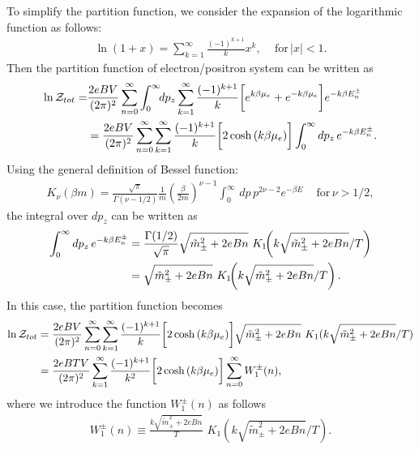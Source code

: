 To simplify the partition function, we consider the expansion of the logarithmic function as follows:
\begin{align}
\ln\left(1+x\right)=\sum^{\infty}_{k=1}\frac{(-1)^{k+1}}{k}x^k, \,\,\,\,\,\,\,\mathrm{for}\,|x|<1.
\end{align}
Then the partition function of electron/positron system can be written as
\begin{align}
\ln\mathcal{Z}_{tot}=&\frac{2eBV}{(2\pi)^2}\sum_{n=0}^\infty\int^\infty_{0} \!\!dp_z\sum^{\infty}_{k=1}\frac{(-1)^{k+1}}{k}\bigg[e^{k\beta\mu_e}+e^{-k\beta\mu_e}\bigg]e^{-k\beta E_n^\pm}\notag\\
&=\frac{2eBV}{(2\pi)^2}\sum_{n=0}^\infty\sum^{\infty}_{k=1}\frac{(-1)^{k+1}}{k}\bigg[2\cosh{(k\beta\mu_e)}\bigg]\int_0^\infty dp_z\,e^{-k\beta E_n^\pm}.
\end{align}
Using the general definition of Bessel function:
\begin{align}
K_\nu(\beta m)=\frac{\sqrt{\pi}}{\Gamma({\nu-1/2})}\frac{1}{m}\left(\frac{\beta}{2m}\right)^{\nu-1}\int_0^\infty\,dp\,p^{2\nu-2}e^{-\beta E} \,\,\,\,\,\,\,\mathrm{for}\,\nu>1/2,
\end{align}
the integral over $dp_z$ can be written as
\begin{align}
\int_0^\infty dp_z\,e^{-k\beta E_n^\pm}&=\frac{\Gamma{(1/2)}}{\sqrt{\pi}}\sqrt{\tilde{m}^2_\pm+2eBn}\,\,K_1\!\!\left({k\sqrt{\tilde{m}^2_\pm+2eBn}}/{T}\right)\notag\\&=\sqrt{\tilde{m}^2_\pm+2eBn}\,\,K_1\!\!\left({k\sqrt{\tilde{m}^2_\pm+2eBn}}/{T}\right).
\end{align}
In this case, the partition function becomes
\begin{align}
\ln\mathcal{Z}_{tot}&=\frac{2eBV}{(2\pi)^2}\sum_{n=0}^\infty\sum^{\infty}_{k=1}\frac{(-1)^{k+1}}{k}\bigg[2\cosh{(k\beta\mu_e)}\bigg]\sqrt{\tilde{m}^2_\pm+2eBn}\,\,K_1({k\sqrt{\tilde{m}^2_\pm+2eBn}}/{T})\notag\\
&=\frac{2eBTV}{(2\pi)^2}\sum^{\infty}_{k=1}\frac{(-1)^{k+1}}{k^2}\bigg[2\cosh{(k\beta\mu_e)}\bigg]\sum_{n=0}^\infty W^\pm_1(n),
\end{align}
where we introduce the function $W^\pm_1(n)$ as follows
\begin{align}
W^\pm_1(n)\equiv\frac{k\sqrt{\tilde{m}^2_\pm+2eBn}}{T}\,\,K_1\!\!\left({k\sqrt{\tilde{m}^2_\pm+2eBn}}/{T}\right).
\end{align}

